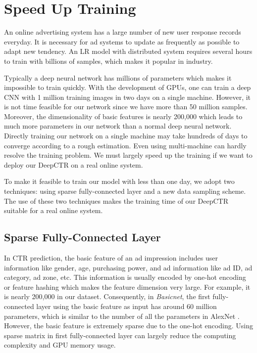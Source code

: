 \documentclass{sig-alternate-05-2015}
\begin{document}
\section{Speed Up Training}
An online advertising system has a large number of new user response records everyday. It is necessary for ad systems  to update as frequently as possible to adapt  new tendency. An LR model with distributed system requires several hours to train with billions of samples, which makes it popular in industry.

Typically a deep neural network has millions of parameters which makes it impossible to train quickly. With the development of GPUs, one can train a deep CNN with 1 million training images in two days on a single machine. However, it is not time feasible for our network since we have more than 50 million samples. Moreover, the dimensionality of basic features is nearly 200,000 which leads to much more parameters in our network than a normal deep neural network. Directly training our network on a single machine may take hundreds of days to converge according to a rough estimation. Even using multi-machine can hardly resolve the training problem. We must largely speed up the training if we want to deploy our DeepCTR on a real online system. 

To make it feasible to train our model with less than one day, we adopt two techniques: using sparse fully-connected layer and a new data sampling scheme. The use of these two techniques makes the training time of our DeepCTR suitable for a real online system.
\subsection{Sparse Fully-Connected Layer}
In CTR prediction, the basic feature of an ad impression includes user information like gender, age, purchasing power, and ad information like ad ID, ad category, ad zone, etc. This information is usually encoded by one-hot encoding or feature hashing \cite{weinberger2009feature} which makes the feature dimension very large. For example, it is nearly 200,000 in our dataset. Consequently, in \emph{Basicnet}, the first fully-connected layer using the basic feature as input has around 60 million parameters, which is similar to the number of all the parameters in  AlexNet \cite{NIPS2012_4824}. However, the basic feature is extremely sparse due to the one-hot encoding. Using sparse matrix in first fully-connected layer can largely reduce the computing complexity and GPU memory usage.
\end{document}

